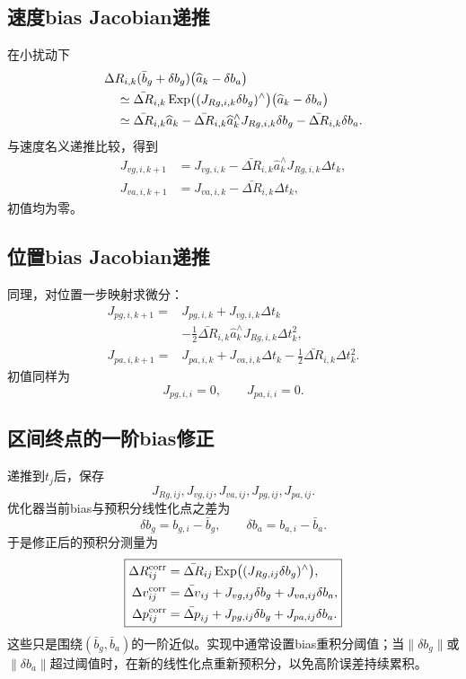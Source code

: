 \subsection{速度bias Jacobian递推}

在小扰动下
\[
\begin{aligned}
    &\Delta R_{i,k}(\bar b_g+\delta b_g)
      \bigl(\widehat a_k-\delta b_a\bigr)\\
    &\quad\simeq
    \bar{\Delta R}_{i,k}
    \operatorname{Exp}\bigl((J_{R g,i,k}\delta b_g)^\wedge\bigr)
    \bigl(\widehat a_k-\delta b_a\bigr)\\
    &\quad\simeq
    \bar{\Delta R}_{i,k}\widehat a_k
    -\bar{\Delta R}_{i,k}\widehat a_k^\wedge
     J_{R g,i,k}\delta b_g
    -\bar{\Delta R}_{i,k}\delta b_a.
\end{aligned}
\]
与速度名义递推比较，得到
\[
\boxed{
\begin{aligned}
    J_{v g,i,k+1}
    &=J_{v g,i,k}
      -\bar{\Delta R}_{i,k}\widehat a_k^\wedge
       J_{R g,i,k}\Delta t_k,\\
    J_{v a,i,k+1}
    &=J_{v a,i,k}
      -\bar{\Delta R}_{i,k}\Delta t_k,
\end{aligned}
}
\]
初值均为零。

\subsection{位置bias Jacobian递推}

同理，对位置一步映射求微分：
\[
\boxed{
\begin{aligned}
    J_{p g,i,k+1}
    ={}&J_{p g,i,k}
      +J_{v g,i,k}\Delta t_k\\
      &-\frac12\bar{\Delta R}_{i,k}\widehat a_k^\wedge
       J_{R g,i,k}\Delta t_k^2,\\
    J_{p a,i,k+1}
    ={}&J_{p a,i,k}
      +J_{v a,i,k}\Delta t_k
      -\frac12\bar{\Delta R}_{i,k}\Delta t_k^2.
\end{aligned}
}
\]
初值同样为
\[
    J_{p g,i,i}=0,
    \qquad
    J_{p a,i,i}=0.
\]

\subsection{区间终点的一阶bias修正}

递推到$t_j$后，保存
\[
    J_{R g,ij},J_{v g,ij},J_{v a,ij},J_{p g,ij},J_{p a,ij}.
\]
优化器当前bias与预积分线性化点之差为
\[
    \delta b_g=b_{g,i}-\bar b_g,
    \qquad
    \delta b_a=b_{a,i}-\bar b_a.
\]
于是修正后的预积分测量为
\[
\boxed{
\begin{aligned}
    \Delta R_{ij}^{\mathrm{corr}}
    &=\bar{\Delta R}_{ij}
      \operatorname{Exp}\bigl((J_{R g,ij}\delta b_g)^\wedge\bigr),\\
    \Delta v_{ij}^{\mathrm{corr}}
    &=\bar{\Delta v}_{ij}
      +J_{v g,ij}\delta b_g
      +J_{v a,ij}\delta b_a,\\
    \Delta p_{ij}^{\mathrm{corr}}
    &=\bar{\Delta p}_{ij}
      +J_{p g,ij}\delta b_g
      +J_{p a,ij}\delta b_a.
\end{aligned}
}
\]
这些只是围绕$(\bar b_g,\bar b_a)$的一阶近似。实现中通常设置bias重积分阈值；当$\|\delta b_g\|$或$\|\delta b_a\|$超过阈值时，在新的线性化点重新预积分，以免高阶误差持续累积。

